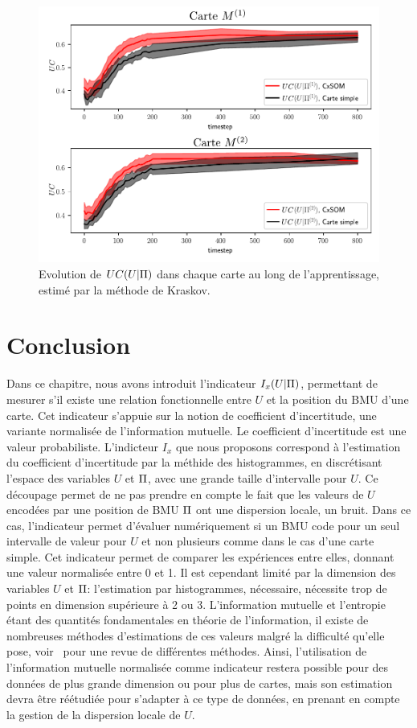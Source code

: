 \begin{figure}
\includegraphics[width=\textwidth]{evolution_MI_K}
\caption{Evolution de $UC(U|\Pi)$ dans chaque carte au long de l'apprentissage, estimé par la méthode de Kraskov.\label{fig:MI_evol_total}}

\end{figure}


\section{Conclusion}

Dans ce chapitre, nous avons introduit l'indicateur $I_x(U|\Pi)$, permettant de mesurer s'il existe une relation fonctionnelle entre $U$ et la position du BMU d'une carte. Cet indicateur s'appuie sur la notion de coefficient d'incertitude, une variante normalisée de l'information mutuelle. Le coefficient d'incertitude est une valeur probabiliste. L'indicteur $I_x$ que nous proposons correspond à l'estimation du coefficient d'incertitude par la méthide des histogrammes, en discrétisant l'espace des variables $U$ et $\Pi$, avec une grande taille d'intervalle pour $U$. Ce découpage permet de ne pas prendre en compte le fait que les valeurs de $U$ encodées par une position de BMU $\Pi$ ont une dispersion locale, un bruit. Dans ce cas, l'indicateur permet d'évaluer numériquement si un BMU code pour un seul intervalle de valeur pour $U$ et non plusieurs comme dans le cas d'une carte simple.
Cet indicateur permet de comparer les expériences entre elles, donnant une valeur normalisée entre 0 et 1.
Il est cependant limité par la dimension des variables $U$ et $\Pi$: l'estimation par histogrammes, nécessaire, nécessite trop de points en dimension supérieure à 2 ou 3.
L'information mutuelle et l'entropie étant des quantités fondamentales en théorie de l'information, il existe de nombreuses méthodes d'estimations de ces valeurs malgré la difficulté qu'elle pose, voir~\cite{Doquire2012ACO} pour une revue de différentes méthodes. 
Ainsi, l'utilisation de l'information mutuelle normalisée comme indicateur restera possible pour des données de plus grande dimension ou pour plus de cartes, mais son estimation devra être réétudiée pour s'adapter à ce type de données, en prenant en compte la gestion de la dispersion locale de $U$.



